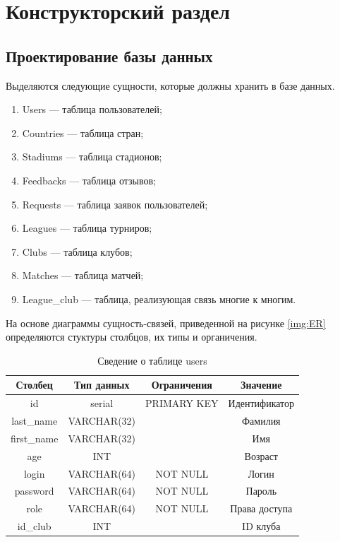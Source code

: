 \section{Конструкторский раздел}
\subsection{Проектирование базы данных}

Выделяются следующие сущности, которые должны хранить в базе данных.

\begin{enumerate}
	\item Users --- таблица пользователей;
	\item Countries --- таблица стран;
	\item Stadiums --- таблица стадионов;
	\item Feedbacks --- таблица отзывов;
	\item Requests --- таблица заявок пользователей;
	\item Leagues --- таблица турниров;
	\item Clubs --- таблица клубов;
	\item Matches --- таблица матчей;
	\item League\_club --- таблица, реализующая связь многие к многим.
\end{enumerate}

На основе диаграммы сущность-связей, приведенной на рисунке \ref{img:ER} определяются стуктуры столбцов, их типы и органичения.

\begin{table}[H]
	\begin{center}
		\caption{Сведение о таблице users}
		\begin{tabular}{|c|c|c|c|}
			\hline
			Столбец & Тип данных & Ограничения & Значение \\
			\hline
			id & serial & PRIMARY KEY & Идентификатор \\
			\hline
			last\_name & VARCHAR(32) & & Фамилия \\
			\hline
			first\_name & VARCHAR(32) & & Имя\\
			\hline
			age & INT &  & Возраст\\
			\hline
			login & VARCHAR(64) & NOT NULL &  Логин \\
			\hline
			password & VARCHAR(64) & NOT NULL & Пароль \\
			\hline
			role & VARCHAR(64) & NOT NULL & Права доступа \\
			\hline
			id\_club & INT &  & ID клуба \\
			\hline			
		\end{tabular}
		\label{table:db:users}
	\end{center}
\end{table}

